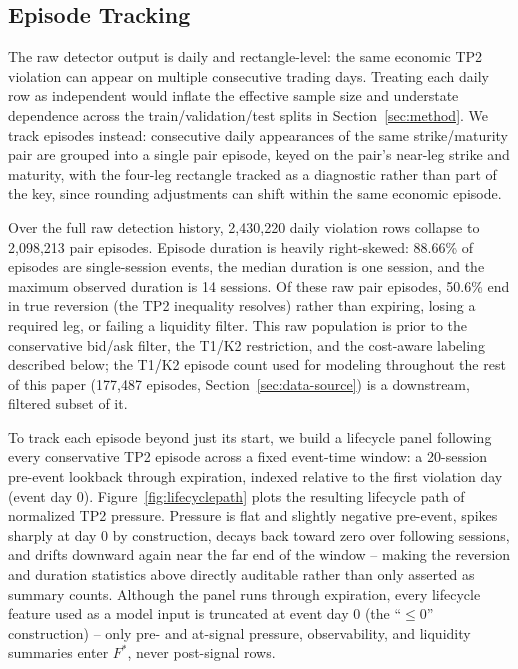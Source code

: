 \documentclass[sigconf,review]{acmart}
\begin{document}
\subsection{Episode Tracking}
\label{sec:episode-tracking}
The raw detector output is daily and rectangle-level: the same economic TP2 violation can appear on multiple consecutive trading days. Treating each daily row as independent would inflate the effective sample size and understate dependence across the train/validation/test splits in Section~\ref{sec:method}. We track episodes instead: consecutive daily appearances of the same strike/maturity pair are grouped into a single pair episode, keyed on the pair's near-leg strike and maturity, with the four-leg rectangle tracked as a diagnostic rather than part of the key, since rounding adjustments can shift within the same economic episode.

Over the full raw detection history, 2{,}430{,}220 daily violation rows collapse to 2{,}098{,}213 pair episodes. Episode duration is heavily right-skewed: 88.66\% of episodes are single-session events, the median duration is one session, and the maximum observed duration is 14 sessions. Of these raw pair episodes, 50.6\% end in true reversion (the TP2 inequality resolves) rather than expiring, losing a required leg, or failing a liquidity filter. This raw population is prior to the conservative bid/ask filter, the T1/K2 restriction, and the cost-aware labeling described below; the T1/K2 episode count used for modeling throughout the rest of this paper (177{,}487 episodes, Section~\ref{sec:data-source}) is a downstream, filtered subset of it.

To track each episode beyond just its start, we build a lifecycle panel following every conservative TP2 episode across a fixed event-time window: a 20-session pre-event lookback through expiration, indexed relative to the first violation day (event day 0). Figure~\ref{fig:lifecyclepath} plots the resulting lifecycle path of normalized TP2 pressure. Pressure is flat and slightly negative pre-event, spikes sharply at day 0 by construction, decays back toward zero over following sessions, and drifts downward again near the far end of the window -- making the reversion and duration statistics above directly auditable rather than only asserted as summary counts. Although the panel runs through expiration, every lifecycle feature used as a model input is truncated at event day 0 (the ``$\le0$'' construction) -- only pre- and at-signal pressure, observability, and liquidity summaries enter $F^{\ast}$, never post-signal rows.
\end{document}
